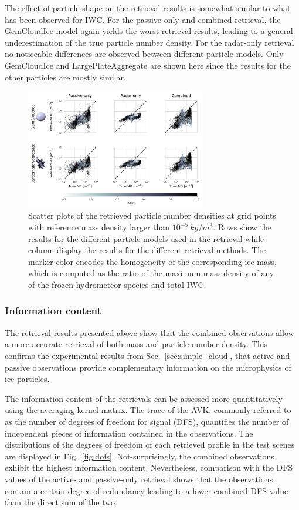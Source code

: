 \documentclass[journal abbreviation, manuscript]{copernicus}
\begin{document}
The effect of particle shape on the retrieval results is somewhat similar to
what has been observed for IWC. For the passive-only and combined retrieval, the
GemCloudIce model again yields the worst retrieval results, leading to a general
underestimation of the true particle number density. For the radar-only
retrieval no noticeable differences are observed between different particle
models. Only GemCloudIce and LargePlateAggregate are shown here since the
results for the other particles are mostly similar.

\begin{figure}
\centering
\includegraphics[width = 0.7\textwidth]{../plots/results_nd_scatter_a}
\caption{Scatter plots of the retrieved particle number densities at grid points
  with reference mass density larger than $10^{-5}\ \unit{kg/m^3}$. Rows show
  the results for the different particle models used in the retrieval while
  column display the results for the different retrieval methods. The marker
  color encodes the homogeneity of the corresponding ice mass, which is computed
  as the ratio of the maximum mass density of any of the frozen hydrometeor
  species and total IWC.}
\label{fig:results_nd_scatter_a}
\end{figure}

\subsubsection{Information content}

The retrieval results presented above show that the combined observations allow a more
accurate retrieval of both mass and particle number density. This confirms the
experimental results from Sec.~\ref{sec:simple_cloud}, that active and passive
observations provide complementary information on the microphysics of ice
particles.

The information content of the retrievals can be assessed more quantitatively
using the averaging kernel matrix. The trace of the AVK, commonly referred to as
the number of degrees of freedom for signal (DFS), quantifies the number of
independent pieces of information contained in the observations. The
distributions of the degrees of freedom of each retrieved profile in the test
scenes are displayed in Fig.~\ref{fig:dofs}. Not-surprisingly, the combined
observations exhibit the highest information content. Nevertheless, comparison
with the DFS values of the active- and passive-only retrieval shows that the
observations contain a certain degree of redundancy leading to a lower combined
DFS value than the direct sum of the two.
\end{document}
